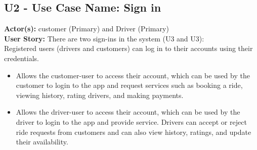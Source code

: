 \documentclass[9pt]{report}
\begin{document}
\subsection*{U2 - Use Case Name: Sign in}
\textbf{Actor(s):} customer (Primary) and Driver (Primary)
\textbf{\\User Story:} 
There are two sign-ins in the system (U3 and U3):\\
Registered users (drivers and customers) can log in to their accounts using their credentials.
\begin{itemize}
    \item Allows the customer-user to access their account, which can be used by the customer to login to the app and request services such as booking a ride, viewing history, rating drivers, and making payments. 
    \item Allows the driver-user to access their account, which can be used by the driver to login to the app and provide service. Drivers can accept or reject ride requests from customers and can also view history, ratings, and update their availability.
\end{itemize}
\end{document}
